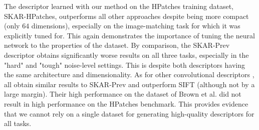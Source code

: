 \documentclass[10pt,conference,a4paper]{IEEEtran}
\begin{document}
		The descriptor learned with our method on the HPatches training dataset, SKAR-HPatches, outperforms all other approaches despite being more compact (only $64$ dimensions),
		especially on the image-matching task for which it was explicitly tuned for.
		This again demonstrates the importance of tuning the neural network to the properties of the dataset.
		By comparison, the SKAR-Prev descriptor obtains significantly worse results on all three tasks, especially in the "hard" and "tough" noise-level settings.
		This is despite both descriptors having the same architecture and dimensionality.
		As for other convolutional descriptors \cite{tfeat,zagoruyko,convdesc}, all obtain similar results to SKAR-Prev and outperform SIFT \cite{sift}
		(although not by a large margin).
		Their high performance on the dataset of Brown et al. \cite{brown} did not result in high performance on the HPatches benchmark.
		This provides evidence that we cannot rely on a single dataset for generating high-quality descriptors for all tasks.
\end{document}
